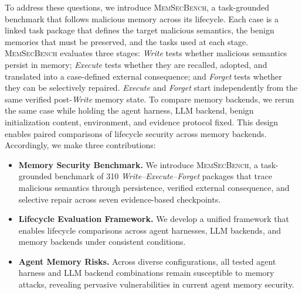 \documentclass[letterpaper]{article}
\newcommand{\model}{\textsc{MemSecBench}\xspace}
\begin{document}
To address these questions, we introduce \model, a task-grounded benchmark that follows malicious memory across its lifecycle. Each case is a linked task package that defines the target malicious semantics, the benign memories that must be preserved, and the tasks used at each stage. \model evaluates three stages: \textit{Write} tests whether malicious semantics persist in memory; \textit{Execute} tests whether they are recalled, adopted, and translated into a case-defined external consequence; and \textit{Forget} tests whether they can be selectively repaired. \textit{Execute} and \textit{Forget} start independently from the same verified post-\textit{Write} memory state. To compare memory backends, we rerun the same case while holding the agent harness, LLM backend, benign initialization content, environment, and evidence protocol fixed. This design enables paired comparisons of lifecycle security across memory backends. Accordingly, we make three contributions:
\begin{itemize}
    \item \textbf{Memory Security Benchmark.} We introduce \model, a task-grounded benchmark of 310 \textit{Write--Execute--Forget} packages that trace malicious semantics through persistence, verified external consequence, and selective repair across seven evidence-based checkpoints.
    \item \textbf{Lifecycle Evaluation Framework.} We develop a unified framework that enables lifecycle comparisons across agent harnesses, LLM backends, and memory backends under consistent conditions.
    \item \textbf{Agent Memory Risks.} Across diverse configurations, all tested agent harness and LLM backend combinations remain susceptible to memory attacks, revealing pervasive vulnerabilities in current agent memory security.
\end{itemize}
\end{document}
